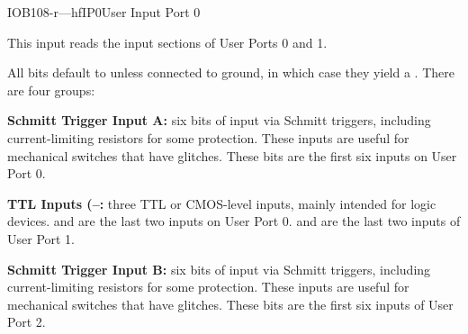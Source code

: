 \begin{ioport}{IOB}{108}{-r---hf}{IP0}{User Input Port 0}

  This input reads the input sections of User Ports 0 and 1.

  \begin{cbitfield}
  \end{cbitfield}

  All bits default to  unless connected to ground, in which case they yield a . There are four groups:

  \begin{description}
  \item{\bfseries Schmitt Trigger Input A:} six bits of input via Schmitt triggers,
    including current-limiting resistors for some protection. These inputs are
    useful for mechanical switches that have glitches. These bits are the first
    six inputs on User Port 0.
  \item{\bfseries TTL Inputs (–:} three TTL or CMOS-level
    inputs, mainly intended for logic devices.  and  are
    the last two inputs on User Port 0.  and  are the last
    two inputs of User Port 1.
  \item{\bfseries Schmitt Trigger Input B:} six bits of input via Schmitt triggers,
    including current-limiting resistors for some protection. These inputs are
    useful for mechanical switches that have glitches. These bits are the first
    six inputs of User Port 2.
  \end{description}

\end{ioport}

